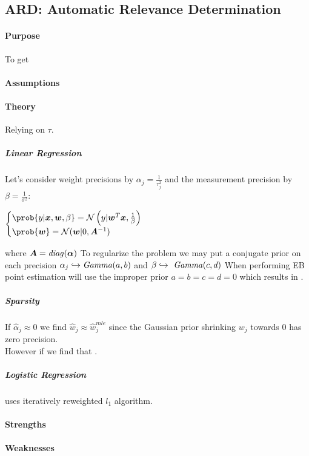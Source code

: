 \subsection{ARD: Automatic Relevance Determination}
\paragraph{Purpose}
To get  
\paragraph{Assumptions}
\paragraph{Theory} 
Relying on  $\tau$.
\subparagraph{Linear Regression}
Let's consider weight precisions by $\alpha_{j}=\frac{1}{\tau_{j}^{2}}$ and the 
measurement precision by $\beta=\frac{1}{\sigma^{2}}$:
\begin{center}
    $\begin{cases}
        \prob{y|\bm{x},\bm{w},\beta} = \mathcal{N}\left(y|\bm{w}^{T}\bm{x},\frac{1}{
            \beta}\right) \\
            \prob{\bm{w}} = \mathcal{N}(\bm{w}|0,\bm{A}^{-1})
    \end{cases}$
\end{center}
where $\bm{A}=\text{\emph{diag}}(\bm{\alpha})$
To regularize the problem we may put a conjugate prior on each precision $\alpha_{j}
\hookrightarrow \text{\emph{Gamma}}(a, b)$ and $\beta \hookrightarrow \text{\emph{
Gamma}}(c, d)$
When performing EB point estimation will use the improper prior $a=b=c=d=0$ which
results in .
\subparagraph{Sparsity}
If $\hat{\alpha}_{j} \approx 0$ we find $\hat{w}_{j}\approx \hat{w}^{mle}_{j}$ since
the Gaussian prior shrinking $w_{j}$ towards 0 has zero precision.\\
However if we find that .
\subparagraph{Logistic Regression}
uses iteratively reweighted $l_{1}$ algorithm.

\paragraph{Strengths}
\paragraph{Weaknesses}
